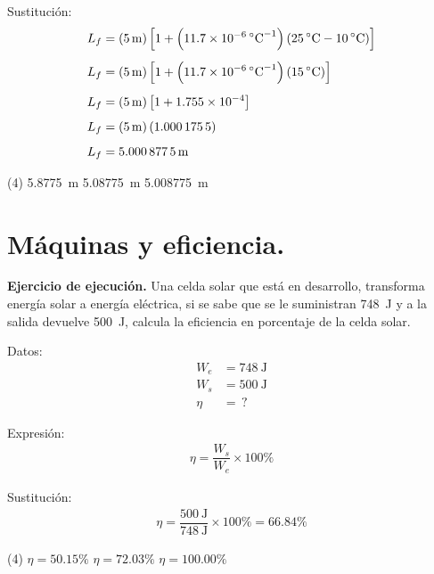 \documentclass[12pt, letter]{exam}
\begin{document}
\begin{questions}
    Sustitución:
    \begin{align*}
    L_{f} &= \left( \SI{5}{\meter} \right) \left[ 1 + \left( \SI{11.7d-6}{\degreeCelsius}^{-1} \right) \left( \SI{25}{\degreeCelsius} - \SI{10}{\degreeCelsius} \right)\right] \\[0.5em]
    L_{f} &= \left( \SI{5}{\meter} \right) \left[ 1 + \left( \SI{11.7d-6}{\degreeCelsius}^{-1} \right) \left( \SI{15}{\degreeCelsius}\right) \right] \\[0.5em]
    L_{f} &= \left( \SI{5}{\meter} \right) \left[ 1 + \num{1.755d-4} \right] \\[0.5em]
    L_{f} &= \left( \SI{5}{\meter} \right) \left( \num{1.0001755} \right) \\[0.5em]
    L_{f} &= \SI{5.0008775}{\meter}
    \end{align*}

    \begin{tasks}(4)
        \task \SI{5.8775}{\meter}
        \task \SI{5.08775}{\meter}
        \task \SI{5.008775}{\meter}
        \task {}
    \end{tasks}

    \section{Máquinas y eficiencia.}

    \setcounter{question}{45} \question \label{Ejercicio_15} \textbf{Ejercicio de ejecución. } Una celda solar que está en desarrollo, transforma energía solar a energía eléctrica, si se sabe que se le suministran \SI{748}{\joule} y a la salida devuelve \SI{500}{\joule}, calcula la eficiencia en porcentaje de la celda solar.

    \begin{minipage}[t]{0.35\linewidth}
    Datos: 
    \begin{align*}
    W_{e} &= \SI{748}{\joule} \\
    W_{s} &= \SI{500}{\joule} \\
    \eta &= \, ?
    \end{align*}
    \end{minipage}
    \hspace{1cm}
    \begin{minipage}[t]{0.4\linewidth}
    Expresión:
    \begin{align*}
        \eta = \dfrac{W_{s}}{W_{e}} \times 100 \%
    \end{align*}
    \end{minipage}

    Sustitución:
    \begin{align*}
    \eta = \dfrac{\SI{500}{\joule}}{\SI{748}{\joule}} \times 100 \% = \num{66.84} \%
    \end{align*}
    \begin{tasks}(4)
        \task $\eta = 50.15 \%$
        \task {}
        \task $\eta = 72.03 \%$
        \task $\eta = 100.00 \%$
    \end{tasks}

\end{questions}
\end{document}
